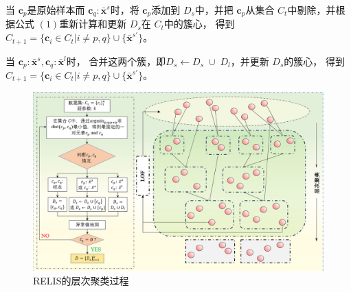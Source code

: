 \documentclass[12pt,a4paper]{article}%
\begin{document}
	当 $\boldsymbol{c}_p$是原始样本而 \(\boldsymbol{c}_q:\bar{\boldsymbol{x}}^s\)时，将 $\boldsymbol{c}_p$添加到 $D_s$中，并把 $\boldsymbol{c}_p$从集合 $C_t$中剔除，并根据公式 $(1)$重新计算和更新 $D_s$在 $C_t$中的簇心，
	得到 $C_{t+1}=\{\boldsymbol{c}_i \in C_{t} | i \neq p, q\} \cup \{{\bar{\boldsymbol{x}}^{s\prime}}\}$。

	当 \( \boldsymbol{c}_p:\bar{\boldsymbol{x}}^s, \boldsymbol{c}_q:\bar{\boldsymbol{x}}^l \)时， 合并这两个簇，即$D_s\leftarrow{D_s}{\;\cup\;}{D_l}$，并更新 $D_s$的簇心，
	得到 $C_{t+1}=\{\boldsymbol{c}_i \in C_{t} | i \neq p, q\} \cup \{{\bar{\boldsymbol{x}}^{s\prime}}\}$。

	\begin{figure}[t!]%
		\centering
		\begin{minipage}{1\textwidth}%
			\centering
			\includegraphics[width=1%
			\textwidth]{聚类过程.png}%
			\caption{\fontsize{10pt}{15pt}\selectfont RELIS的层次聚类过程}%
		\end{minipage}
	\end{figure}
\end{document}
